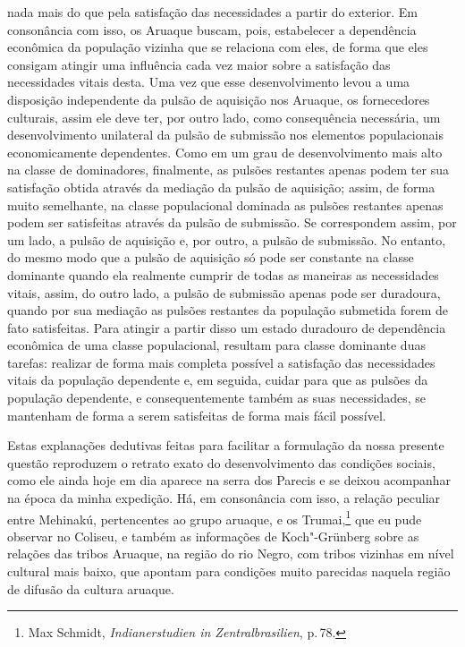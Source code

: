 nada mais do que pela satisfação das necessidades a partir do exterior.
Em consonância com isso, os Aruaque buscam, pois, estabelecer a
dependência econômica da população vizinha que se relaciona com eles, de
forma que eles consigam atingir uma influência cada vez maior sobre a
satisfação das necessidades vitais desta. Uma vez que esse
desenvolvimento levou a uma disposição independente da pulsão de
aquisição nos Aruaque, os fornecedores culturais, assim ele deve ter,
por outro lado, como consequência necessária, um desenvolvimento
unilateral da pulsão de submissão nos elementos populacionais
economicamente dependentes. Como em um grau de desenvolvimento mais alto
na classe de dominadores, finalmente, as pulsões restantes apenas podem
ter sua satisfação obtida através da mediação da pulsão de aquisição;
assim, de forma muito semelhante, na classe populacional dominada as
pulsões restantes apenas podem ser satisfeitas através da pulsão de
submissão. Se correspondem assim, por um lado, a pulsão de aquisição e,
por outro, a pulsão de submissão. No entanto, do mesmo modo que a pulsão
de aquisição só pode ser constante na classe dominante quando ela
realmente cumprir de todas as maneiras as necessidades vitais, assim, do
outro lado, a pulsão de submissão apenas pode ser duradoura, quando por
sua mediação as pulsões restantes da população submetida forem de fato
satisfeitas. Para atingir a partir disso um estado duradouro de
dependência econômica de uma classe populacional, resultam para classe
dominante duas tarefas: realizar de forma mais completa possível a
satisfação das necessidades vitais da população dependente e, em
seguida, cuidar para que as pulsões da população dependente, e
consequentemente também as suas necessidades, se mantenham de forma a
serem satisfeitas de forma mais fácil possível.

Estas explanações dedutivas feitas para facilitar a formulação da nossa
presente questão reproduzem o retrato exato do desenvolvimento das
condições sociais, como ele ainda hoje em dia aparece na serra dos
Parecis e se deixou acompanhar na época da minha expedição. Há, em
consonância com isso, a relação peculiar entre Mehinakú, pertencentes ao
grupo aruaque, e os Trumai,\footnote{Max Schmidt, \textit{Indianerstudien
  in Zentralbrasilien}, p.\,78.} que eu pude observar no Coliseu, e
também as informações de Koch"-Grünberg sobre as relações das tribos
Aruaque, na região do rio Negro, com tribos vizinhas em nível cultural
mais baixo, que apontam para condições muito parecidas naquela região
de difusão da cultura aruaque.

